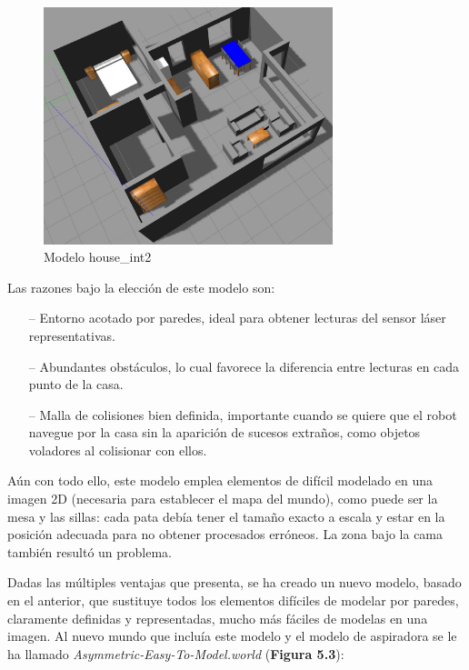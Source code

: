 \begin{figure}[H]
  \begin{center}
    \includegraphics[width=0.75\textwidth]{figures/houseint.jpg}
		\caption{Modelo house\_int2}
		\label{fig.houseint}
		\end{center}
\end{figure}

Las razones bajo la elección de este modelo son:

\begin{itemize}
	\item[--] Entorno acotado por paredes, ideal para obtener lecturas del sensor láser representativas.
	\item[--]	Abundantes obstáculos, lo cual favorece la diferencia entre lecturas en cada punto de la casa.
	\item[--]	Malla de colisiones bien definida, importante cuando se quiere que el robot navegue por la casa sin la aparición de sucesos extraños, como objetos voladores al colisionar con ellos. 
\end{itemize}

Aún con todo ello, este modelo emplea elementos de difícil modelado en una imagen 2D (necesaria para establecer el mapa del mundo), como puede ser la mesa y las sillas: cada pata debía tener el tamaño exacto a escala y estar en la posición adecuada para no obtener procesados erróneos. La zona bajo la cama también resultó un problema. 

Dadas las múltiples ventajas que presenta, se ha creado un nuevo modelo, basado en el anterior, que sustituye todos los elementos difíciles de modelar por paredes, claramente definidas y representadas, mucho más fáciles de modelas en una imagen. Al nuevo mundo que incluía este modelo y el modelo de aspiradora se le ha llamado \textit{Asymmetric-Easy-To-Model.world} (\textbf{Figura 5.3}):

